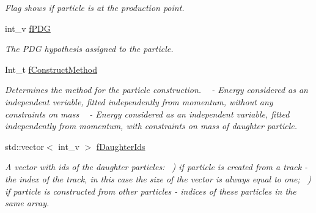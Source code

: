 \begin{DoxyCompactItemize}
\begin{DoxyCompactList}\small\item\em Flag shows if particle is at the production point. \end{DoxyCompactList}\item 
int\+\_\+v \hyperlink{classKFParticleBaseSIMD_a80a98ddcb03c9ef62e78257c8dbffe2d}{f\+P\+DG}\hypertarget{classKFParticleBaseSIMD_a80a98ddcb03c9ef62e78257c8dbffe2d}{}\label{classKFParticleBaseSIMD_a80a98ddcb03c9ef62e78257c8dbffe2d}

\begin{DoxyCompactList}\small\item\em The P\+DG hypothesis assigned to the particle. \end{DoxyCompactList}\item 
Int\+\_\+t \hyperlink{classKFParticleBaseSIMD_a509a7ba63eb251b7f40e2282a4754377}{f\+Construct\+Method}\hypertarget{classKFParticleBaseSIMD_a509a7ba63eb251b7f40e2282a4754377}{}\label{classKFParticleBaseSIMD_a509a7ba63eb251b7f40e2282a4754377}

\begin{DoxyCompactList}\small\item\em Determines the method for the particle construction. ~ -\/ Energy considered as an independent veriable, fitted independently from momentum, without any constraints on mass ~ -\/ Energy considered as an independent variable, fitted independently from momentum, with constraints on mass of daughter particle. \end{DoxyCompactList}\item 
std\+::vector$<$ int\+\_\+v $>$ \hyperlink{classKFParticleBaseSIMD_ac8e0407b65c920d778068278468e5343}{f\+Daughter\+Ids}\hypertarget{classKFParticleBaseSIMD_ac8e0407b65c920d778068278468e5343}{}\label{classKFParticleBaseSIMD_ac8e0407b65c920d778068278468e5343}

\begin{DoxyCompactList}\small\item\em A vector with ids of the daughter particles\+: ~) if particle is created from a track -\/ the index of the track, in this case the size of the vector is always equal to one; ~) if particle is constructed from other particles -\/ indices of these particles in the same array. \end{DoxyCompactList}\end{DoxyCompactItemize}


